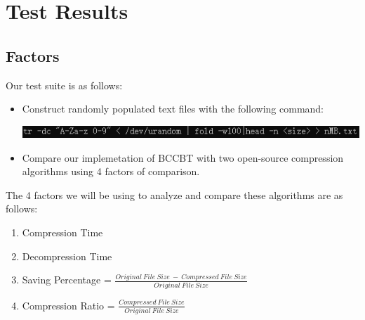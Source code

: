 \documentclass{beamer}
\begin{document}
\section{Test Results}
\subsection{Factors}
\begin{frame}
Our test suite is as follows:
\begin{itemize}
\item Construct randomly populated text files with the following command:
\begin{center}
\includegraphics[scale=0.65]{command}
\end{center}
\item Compare our implemetation of BCCBT with two open-source compression algorithms
using 4 factors of comparison.
\end{itemize}
\end{frame}

\begin{frame}
The 4 factors we will be using to analyze and compare these algorithms are as follows:
\begin{enumerate}
    \item Compression Time 
    \item Decompression Time
    \item Saving Percentage = $\frac{Original\ File\ Size\ -\ Compressed\ File\ Size}{Original\ File\ Size}$
    \item Compression Ratio = $\frac{Compressed\ File\ Size}{Original\ File\ Size}$
\end{enumerate}
\end{frame}
\end{document}
